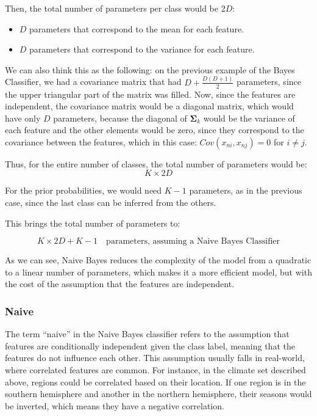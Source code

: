 \documentclass[12pt,a4paper,oneside]{paper}
\begin{document}
Then, the total number of parameters per class would be $2D$: 
\begin{itemize}
    \item $D$ parameters that correspond to the mean for each feature.
    \item $D$ parameters that correspond to the variance for each feature.
\end{itemize}

We can also think this as the following: on the previous example of the Bayes Classifier, we had a covariance matrix that had $D + \frac{D(D+1)}{2}$ parameters, since the 
upper triangular part of the matrix was filled. Now, since the features are independent, the covariance matrix would be a diagonal matrix, which would have only $D$ parameters, because
the diagonal of $\bm{\Sigma}_k$ would be the variance of each feature and the other elements would be zero, since they correspond to the covariance between the features, which in this case: $Cov(x_{ni}, x_{nj}) = 0$ for $i \neq j$.

Thus, for the entire number of classes, the total number of parameters would be:
 $$
 K \times 2D
 $$

For the prior probabilities, we would need $K - 1$ parameters, as in the previous case, since the last class can be inferred from the others.

This brings the total number of parameters to:

$$
K \times 2D + K - 1 \quad \text{parameters, assuming a Naive Bayes Classifier}
$$

As we can see, Naive Bayes reduces the complexity of the model from a quadratic to a linear number of parameters, which makes it a more efficient model, but with the cost of the assumption that the features are independent.

\subsubsection*{Naive}

The term “naive” in the Naive Bayes classifier refers to the assumption that features are conditionally
independent given the class label, meaning that the features do not influence each other.
This assumption usually falls in real-world, where correlated features are common.
For instance, in the climate set described above, regions could be correlated based on their location.
If one region is in the southern hemisphere and another in the northern hemisphere,
their seasons would be inverted, which means they have a negative correlation.
\end{document}
